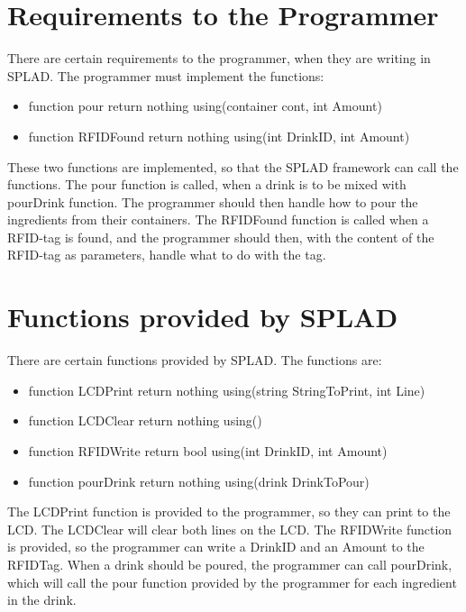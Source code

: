 \section{Requirements to the Programmer}
There are certain requirements to the programmer, when they are writing in SPLAD. The programmer must implement the functions:
\begin{itemize}
	\item {\color[rgb]{0,0,1}function} pour {\color[rgb]{0,0,1}return} {\color[rgb]{0.545,0.133,0.133}nothing} {\color[rgb]{0,0,1}using}({\color[rgb]{0.545,0.133,0.133}container} cont, {\color[rgb]{0.545,0.133,0.133}int} Amount)
	\item {\color[rgb]{0,0,1}function} RFIDFound {\color[rgb]{0,0,1}return} {\color[rgb]{0.545,0.133,0.133}nothing} {\color[rgb]{0,0,1}using}({\color[rgb]{0.545,0.133,0.133}int} DrinkID, {\color[rgb]{0.545,0.133,0.133}int} Amount)
\end{itemize}
These two functions are implemented, so that the SPLAD framework can call the functions. The pour function is called, when a drink is to be mixed with pourDrink function. The programmer should then handle how to pour the ingredients from their containers.
The RFIDFound function is called when a RFID-tag is found, and the programmer should then, with the content of the RFID-tag as parameters, handle what to do with the tag.

\section{Functions provided by SPLAD}
There are certain functions provided by SPLAD. The functions are:
\begin{itemize}
	\item {\color[rgb]{0,0,1}function} LCDPrint {\color[rgb]{0,0,1}return} {\color[rgb]{0.545,0.133,0.133}nothing} {\color[rgb]{0,0,1}using}({\color[rgb]{0.545,0.133,0.133}string} StringToPrint, {\color[rgb]{0.545,0.133,0.133}int} Line)
	\item {\color[rgb]{0,0,1}function} LCDClear {\color[rgb]{0,0,1}return} {\color[rgb]{0.545,0.133,0.133}nothing} {\color[rgb]{0,0,1}using}()
	\item {\color[rgb]{0,0,1}function} RFIDWrite {\color[rgb]{0,0,1}return} {\color[rgb]{0.545,0.133,0.133}bool} {\color[rgb]{0,0,1}using}({\color[rgb]{0.545,0.133,0.133}int} DrinkID, {\color[rgb]{0.545,0.133,0.133}int} Amount)
	\item {\color[rgb]{0,0,1}function} pourDrink {\color[rgb]{0,0,1}return} {\color[rgb]{0.545,0.133,0.133}nothing} {\color[rgb]{0,0,1}using}({\color[rgb]{0.545,0.133,0.133}drink} DrinkToPour)
\end{itemize}
The LCDPrint function is provided to the programmer, so they can print to the LCD. The LCDClear will clear both lines on the LCD. The RFIDWrite function is provided, so the programmer can write a DrinkID and an Amount to the RFIDTag. When a drink should be poured, the programmer can call pourDrink, which will call the pour function provided by the programmer for each ingredient in the drink.
